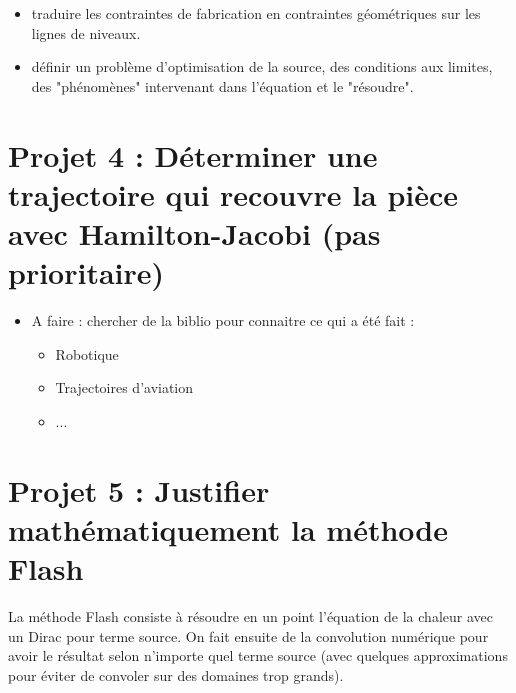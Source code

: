\documentclass[11pt,a4paper]{article}
\begin{document}
\begin{itemize}
\begin{itemize}
		\item traduire les contraintes de fabrication en contraintes géométriques sur les lignes de niveaux.
		
		\item définir un problème d'optimisation de la source, des conditions aux limites, des "phénomènes" intervenant dans l'équation et le "résoudre".
	\end{itemize}
	
\end{itemize}



\section{Projet 4 : Déterminer une trajectoire qui recouvre la pièce avec Hamilton-Jacobi (pas prioritaire)}
\begin{itemize}
	\item A faire : chercher de la biblio pour connaitre ce qui a été fait :
	\begin{itemize}
		\item Robotique
		\item Trajectoires d'aviation
		\item ...
	\end{itemize}
\end{itemize}

\section{Projet 5 : Justifier mathématiquement la méthode Flash}
La méthode Flash consiste à résoudre en un point l'équation de la chaleur avec un Dirac pour terme source. On fait ensuite de la convolution numérique pour avoir le résultat selon n'importe quel terme source (avec quelques approximations pour éviter de convoler sur des domaines trop grands).
\end{document}
